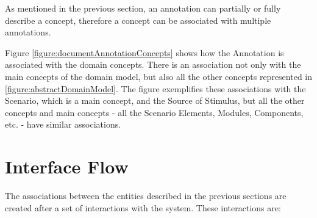 As mentioned in the previous section, an annotation can partially or fully describe a concept, therefore a concept can be associated with multiple annotations. 

Figure \ref{figure:documentAnnotationConcepts} shows how the Annotation is associated with the domain concepts. There is an association not only with the main concepts of the domain model, but also all the other concepts represented in \ref{figure:abstractDomainModel}. The figure exemplifies these associations with the Scenario, which is a main concept, and the Source of Stimulus, but all the other concepts and main concepts - all the Scenario Elements, Modules, Components, etc. - have similar associations.  

\section{Interface Flow}
\label{section:interfaceFlow}

The associations between the entities described in the previous sections are created after a set of interactions with the system. These interactions are:


